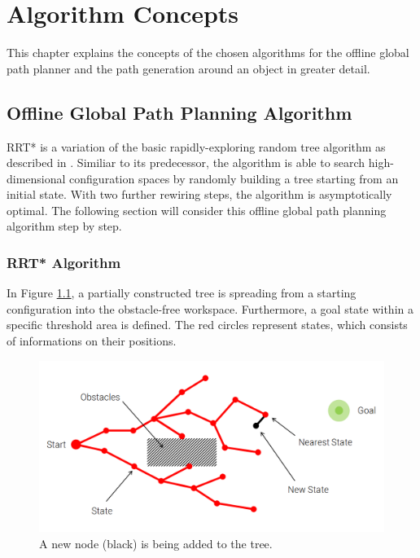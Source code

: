 \chapter{Algorithm Concepts }
\label{sec:algorithm_concepts}

This chapter explains the concepts of the chosen algorithms for the offline global path planner and the path generation around an object in greater detail.

\section{Offline Global Path Planning Algorithm}

RRT* is a variation of the basic rapidly-exploring random tree algorithm as described in \citealp{Karaman2011}. Similiar to its predecessor, the algorithm is able to search high-dimensional configuration spaces by randomly building a tree starting from an initial state. With two further rewiring steps, the algorithm is asymptotically optimal. The following section will consider this offline global path planning algorithm step by step.

\subsection{RRT* Algorithm}
\label{(sec: rrt*)}

In Figure \ref{pics:rrt1}, a partially constructed tree is spreading from a starting configuration into the obstacle-free workspace. Furthermore, a goal state within a specific threshold area is defined. The red circles represent states, which consists of informations
 on their positions. \\

\begin{figure} [h]
	\centering
	\includegraphics[width=1\textwidth]{images/rrt1.png}
	\caption{A new node (black) is being added to the tree.}
	\label{pics:rrt1}
\end{figure}

